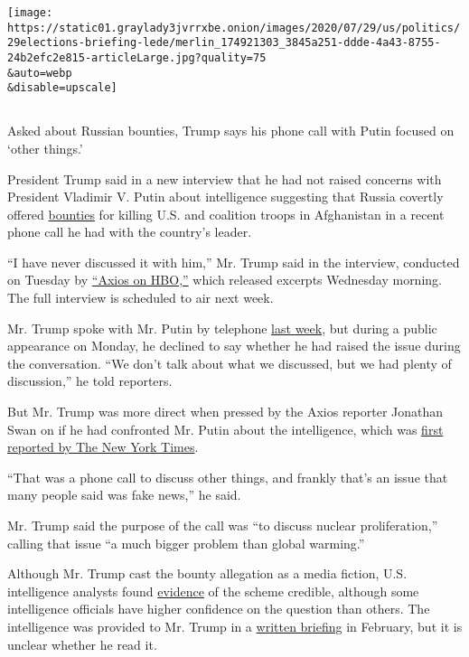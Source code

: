 \texttt{[image: https://static01.graylady3jvrrxbe.onion/images/2020/07/29/us/politics/29elections-briefing-lede/merlin\_174921303\_3845a251-ddde-4a43-8755-24b2efc2e815-articleLarge.jpg?quality=75\\\&auto=webp\\\&disable=upscale]}

\subsection{}

Asked about Russian bounties, Trump says his phone call with Putin
focused on `other things.'

President Trump said in a new interview that he had not raised concerns
with President Vladimir V. Putin about intelligence suggesting that
Russia covertly offered
\href{https://www.nytimes3xbfgragh.onion/2020/07/03/world/europe/russia-bounties-putin-afghanistan.html}{bounties}
for killing U.S. and coalition troops in Afghanistan in a recent phone
call he had with the country's leader.

``I have never discussed it with him,'' Mr. Trump said in the interview,
conducted on Tuesday by
\href{https://www.axios.com/trump-russia-bounties-taliban-putin-call-4a0f6110-ab58-41c0-96fc-57b507462af1.html?utm_source=newsletter\&utm_medium=email\&utm_campaign=newsletter_axiosam\&stream=top}{``Axios
on HBO,''} which released excerpts Wednesday morning. The full interview
is scheduled to air next week.

Mr. Trump spoke with Mr. Putin by telephone
\href{https://www.nytimes3xbfgragh.onion/reuters/2020/07/23/world/europe/23reuters-russia-usa-putin-trump.html}{last
week}, but during a public appearance on Monday, he declined to say
whether he had raised the issue during the conversation. ``We don't talk
about what we discussed, but we had plenty of discussion,'' he told
reporters.

But Mr. Trump was more direct when pressed by the Axios reporter
Jonathan Swan on if he had confronted Mr. Putin about the intelligence,
which was
\href{https://www.nytimes3xbfgragh.onion/2020/06/29/us/politics/russian-bounty-trump.html}{first
reported by The New York Times}.

``That was a phone call to discuss other things, and frankly that's an
issue that many people said was fake news,'' he said.

Mr. Trump said the purpose of the call was ``to discuss nuclear
proliferation,'' calling that issue ``a much bigger problem than global
warming.''

Although Mr. Trump cast the bounty allegation as a media fiction, U.S.
intelligence analysts found
\href{https://slack-redir.net/link?url=https\%3A\%2F\%2Fwww.nytimes3xbfgragh.onion\%2F2020\%2F06\%2F30\%2Fus\%2Fpolitics\%2Frussian-bounties-afghanistan-intelligence.html}{evidence}
of the scheme credible, although some intelligence officials have higher
confidence on the question than others. The intelligence was provided to
Mr. Trump in a
\href{https://slack-redir.net/link?url=https\%3A\%2F\%2Fwww.nytimes3xbfgragh.onion\%2F2020\%2F06\%2F29\%2Fus\%2Fpolitics\%2Frussian-bounty-trump.html}{written
briefing} in February, but it is unclear whether he read it.

